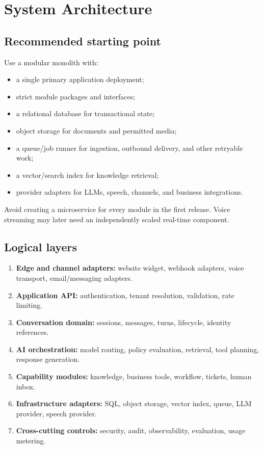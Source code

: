 \chapter{System Architecture}

\section{Recommended starting point}

Use a modular monolith with:

\begin{itemize}
\item a single primary application deployment;
\item strict module packages and interfaces;
\item a relational database for transactional state;
\item object storage for documents and permitted media;
\item a queue/job runner for ingestion, outbound delivery, and other retryable work;
\item a vector/search index for knowledge retrieval;
\item provider adapters for LLMs, speech, channels, and business integrations.
\end{itemize}
Avoid creating a microservice for every module in the first release. Voice streaming may later need an independently scaled real-time component.

\section{Logical layers}

\begin{enumerate}
\item \textbf{Edge and channel adapters:} website widget, webhook adapters, voice transport, email/messaging adapters.
\item \textbf{Application API:} authentication, tenant resolution, validation, rate limiting.
\item \textbf{Conversation domain:} sessions, messages, turns, lifecycle, identity references.
\item \textbf{AI orchestration:} model routing, policy evaluation, retrieval, tool planning, response generation.
\item \textbf{Capability modules:} knowledge, business tools, workflow, tickets, human inbox.
\item \textbf{Infrastructure adapters:} SQL, object storage, vector index, queue, LLM provider, speech provider.
\item \textbf{Cross-cutting controls:} security, audit, observability, evaluation, usage metering.
\end{enumerate}
